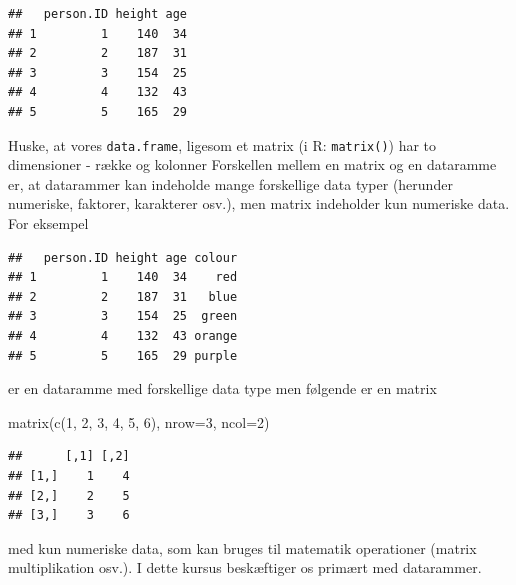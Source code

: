 \documentclass[
]{book}
\newenvironment{Shaded}{\begin{snugshade}}{\end{snugshade}}
\newcommand{\AttributeTok}[1]{\textcolor[rgb]{0.77,0.63,0.00}{#1}}
\newcommand{\DecValTok}[1]{\textcolor[rgb]{0.00,0.00,0.81}{#1}}
\newcommand{\FunctionTok}[1]{\textcolor[rgb]{0.00,0.00,0.00}{#1}}
\newcommand{\NormalTok}[1]{#1}
\newcommand{\OtherTok}[1]{\textcolor[rgb]{0.56,0.35,0.01}{#1}}
\newcommand{\SpecialCharTok}[1]{\textcolor[rgb]{0.00,0.00,0.00}{#1}}
\newcommand{\StringTok}[1]{\textcolor[rgb]{0.31,0.60,0.02}{#1}}
\begin{document}
\begin{verbatim}
##   person.ID height age
## 1         1    140  34
## 2         2    187  31
## 3         3    154  25
## 4         4    132  43
## 5         5    165  29
\end{verbatim}

Huske, at vores \texttt{data.frame}, ligesom et matrix (i R: \texttt{matrix()}) har to dimensioner - række og kolonner Forskellen mellem en matrix og en dataramme er, at datarammer kan indeholde mange forskellige data typer (herunder numeriske, faktorer, karakterer osv.), men matrix indeholder kun numeriske data. For eksempel

\begin{Shaded}
\end{Shaded}

\begin{verbatim}
##   person.ID height age colour
## 1         1    140  34    red
## 2         2    187  31   blue
## 3         3    154  25  green
## 4         4    132  43 orange
## 5         5    165  29 purple
\end{verbatim}

er en dataramme med forskellige data type men følgende er en matrix

\begin{Shaded}
\begin{Highlighting}[]
\FunctionTok{matrix}\NormalTok{(}\FunctionTok{c}\NormalTok{(}\DecValTok{1}\NormalTok{, }\DecValTok{2}\NormalTok{, }\DecValTok{3}\NormalTok{, }\DecValTok{4}\NormalTok{, }\DecValTok{5}\NormalTok{, }\DecValTok{6}\NormalTok{), }
    \AttributeTok{nrow=}\DecValTok{3}\NormalTok{,}
    \AttributeTok{ncol=}\DecValTok{2}\NormalTok{)}
\end{Highlighting}
\end{Shaded}

\begin{verbatim}
##      [,1] [,2]
## [1,]    1    4
## [2,]    2    5
## [3,]    3    6
\end{verbatim}

med kun numeriske data, som kan bruges til matematik operationer (matrix multiplikation osv.). I dette kursus beskæftiger os primært med datarammer.
\end{document}
